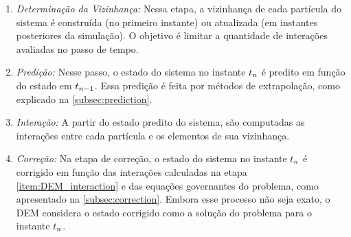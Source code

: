 \begin{enumerate}
	\item \textit{Determinação da Vizinhança:} Nessa etapa, a vizinhança de cada partícula do sistema é construída (no primeiro instante) ou atualizada (em instantes posteriores da simulação). O objetivo é limitar a quantidade de interações avaliadas no passo de tempo. \label{item:DEM_neighborhood}
	\item \textit{Predição:} Nesse passo, o estado do sistema no instante \(\instant[n]\) é predito em função do estado em \(\instant[n-1]\). Essa predição é feita por métodos de extrapolação, como explicado na \autoref{subsec:prediction}. \label{item:DEM_prediction}
	\item \textit{Interação:} A partir do estado predito do sistema, são computadas as interações entre cada partícula e os elementos de sua vizinhança. \label{item:DEM_interaction}
	\item \textit{Correção:} Na etapa de correção, o estado do sistema no instante \(\instant[n]\) é corrigido em função das interações calculadas na etapa \ref{item:DEM_interaction} e das equações governantes do problema, como apresentado na \autoref{subsec:correction}. Embora esse processo não seja exato, o DEM considera o estado corrigido como a solução do problema para o instante \(\instant[n]\). \label{item:DEM_correction}
\end{enumerate}

